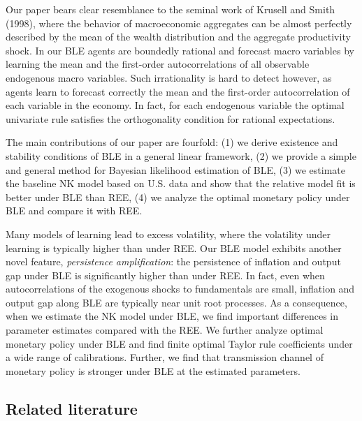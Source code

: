Our paper bears clear resemblance to the seminal work of Krusell and Smith (1998), where the behavior of macroeconomic aggregates can be almost perfectly described by the mean of the wealth distribution and the aggregate productivity shock. In our BLE agents are boundedly rational and forecast macro variables by learning the mean and the first-order autocorrelations of all observable endogenous macro variables. Such irrationality is hard to detect however, as agents learn  to forecast correctly the mean and the first-order autocorrelation of each variable in the economy. In fact, for each endogenous variable the optimal univariate rule satisfies the orthogonality condition for rational expectations. 

The main contributions of our paper are fourfold: (1) we derive existence and stability conditions of BLE in a general linear framework, (2) we provide a simple and general method for Bayesian likelihood estimation of BLE, (3) we estimate the baseline NK model based on U.S. data and show that the relative model fit is better under BLE than REE, (4) we analyze the optimal monetary policy under BLE and compare it with REE.

Many models of learning lead to excess volatility, where the volatility under learning is typically higher than under REE. Our BLE model exhibits another novel feature, {\it persistence amplification}: the persistence of inflation and output gap under BLE is significantly higher than under REE. In fact, even when autocorrelations of the exogenous shocks to fundamentals are small, inflation and output gap along BLE are typically near unit root processes. As a consequence, 
when we estimate the NK model under BLE, we find important differences in parameter estimates compared with the REE. We further analyze optimal monetary policy under BLE and find finite optimal Taylor rule coefficients under a wide range of calibrations. Further, we find that transmission channel of monetary policy is stronger under BLE at the estimated parameters.


\subsection*{Related literature}

